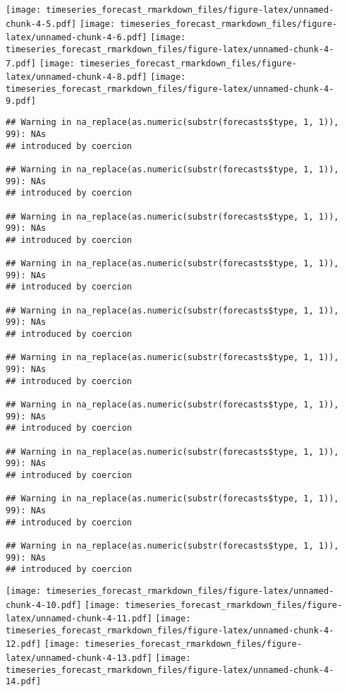 \documentclass[
]{article}
\begin{document}
\texttt{[image: timeseries\_forecast\_rmarkdown\_files/figure-latex/unnamed-chunk-4-5.pdf]}
\texttt{[image: timeseries\_forecast\_rmarkdown\_files/figure-latex/unnamed-chunk-4-6.pdf]}
\texttt{[image: timeseries\_forecast\_rmarkdown\_files/figure-latex/unnamed-chunk-4-7.pdf]}
\texttt{[image: timeseries\_forecast\_rmarkdown\_files/figure-latex/unnamed-chunk-4-8.pdf]}
\texttt{[image: timeseries\_forecast\_rmarkdown\_files/figure-latex/unnamed-chunk-4-9.pdf]}

\begin{verbatim}
## Warning in na_replace(as.numeric(substr(forecasts$type, 1, 1)), 99): NAs
## introduced by coercion

## Warning in na_replace(as.numeric(substr(forecasts$type, 1, 1)), 99): NAs
## introduced by coercion

## Warning in na_replace(as.numeric(substr(forecasts$type, 1, 1)), 99): NAs
## introduced by coercion

## Warning in na_replace(as.numeric(substr(forecasts$type, 1, 1)), 99): NAs
## introduced by coercion

## Warning in na_replace(as.numeric(substr(forecasts$type, 1, 1)), 99): NAs
## introduced by coercion

## Warning in na_replace(as.numeric(substr(forecasts$type, 1, 1)), 99): NAs
## introduced by coercion

## Warning in na_replace(as.numeric(substr(forecasts$type, 1, 1)), 99): NAs
## introduced by coercion

## Warning in na_replace(as.numeric(substr(forecasts$type, 1, 1)), 99): NAs
## introduced by coercion

## Warning in na_replace(as.numeric(substr(forecasts$type, 1, 1)), 99): NAs
## introduced by coercion

## Warning in na_replace(as.numeric(substr(forecasts$type, 1, 1)), 99): NAs
## introduced by coercion
\end{verbatim}

\texttt{[image: timeseries\_forecast\_rmarkdown\_files/figure-latex/unnamed-chunk-4-10.pdf]}
\texttt{[image: timeseries\_forecast\_rmarkdown\_files/figure-latex/unnamed-chunk-4-11.pdf]}
\texttt{[image: timeseries\_forecast\_rmarkdown\_files/figure-latex/unnamed-chunk-4-12.pdf]}
\texttt{[image: timeseries\_forecast\_rmarkdown\_files/figure-latex/unnamed-chunk-4-13.pdf]}
\texttt{[image: timeseries\_forecast\_rmarkdown\_files/figure-latex/unnamed-chunk-4-14.pdf]}
\end{document}
